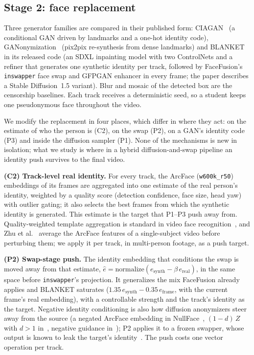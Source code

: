 
\subsection{Stage 2: face replacement}

Three generator families are compared in their published form: CIAGAN~\cite{ciagan}
(a conditional GAN driven by landmarks and a one-hot identity code),
GANonymization~\cite{hellmann} (pix2pix re-synthesis from dense landmarks) and
BLANKET~\cite{blanket} in its released code (an SDXL inpainting model with two
ControlNets and a refiner that generates one synthetic identity per track,
followed by FaceFusion's \texttt{inswapper} face swap and GFPGAN enhancer in
every frame; the paper describes a Stable Diffusion~1.5 variant). Blur and mosaic of the detected box are the censorship baselines.
Each track receives a deterministic seed, so a student keeps one pseudonymous
face throughout the video.

We modify the replacement in four places, which differ in where they act: on
the estimate of who the person is (C2), on the swap (P2), on a GAN's identity
code (P3) and inside the diffusion sampler (P1). None of the mechanisms is new
in isolation; what we study is where in a hybrid diffusion-and-swap pipeline
an identity push survives to the final video.

\textbf{(C2) Track-level real identity.} For every track, the ArcFace
(\texttt{w600k\_r50}) embeddings of its frames are aggregated into one estimate
of the real person's identity, weighted by a quality score (detection
confidence, face size, head yaw) with outlier gating; it also selects the best
frames from which the synthetic identity is generated. This estimate is the
target that P1--P3 push away from. Quality-weighted template aggregation is
standard in video face recognition~\cite{nan,qan}, and Zhu et al.~\cite{zhu-bmsb}
average the ArcFace features of a single-subject video before perturbing them;
we apply it per track, in multi-person footage, as a push target.

\textbf{(P2) Swap-stage push.} The identity embedding that conditions the swap is
moved away from that estimate,
$\hat{e} = \mathrm{normalize}(e_{\mathrm{synth}} - \beta\, e_{\mathrm{real}})$,
in the same space before \texttt{inswapper}'s projection. It generalizes the mix
FaceFusion already applies and BLANKET saturates
($1.35\,e_{\mathrm{synth}} - 0.35\,e_{\mathrm{frame}}$, with the current frame's
real embedding), with a controllable strength and the track's identity as the
target. Negative identity conditioning is also how diffusion anonymizers steer
away from the source (a negated ArcFace embedding in NullFace~\cite{nullface},
$(1-d)\,Z$ with $d>1$ in~\cite{kung}, negative guidance
in~\cite{revpers}); P2 applies it to a frozen swapper, whose output is known to
leak the target's identity~\cite{bondalakunta}. The push costs one vector
operation per track.

